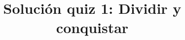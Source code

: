 \documentclass{doc}
\title{Solución quiz 1: Dividir y conquistar}
\begin{document}
\makedocheader
\soluciontrue

\end{document}
